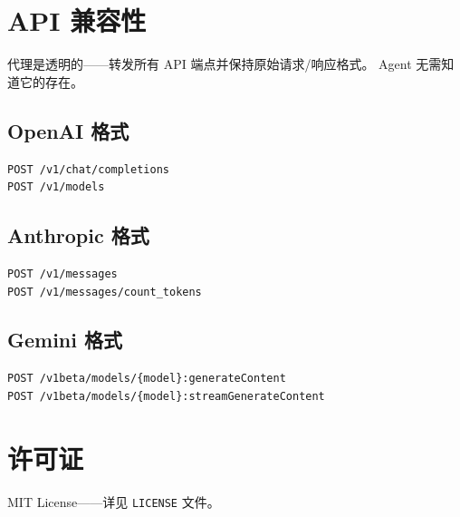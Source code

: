 \documentclass[11pt,a4paper]{article}
\begin{document}
\section{API 兼容性}

代理是透明的——转发所有 API 端点并保持原始请求/响应格式。
Agent 无需知道它的存在。

\subsection{OpenAI 格式}

\begin{verbatim}
POST /v1/chat/completions
POST /v1/models
\end{verbatim}

\subsection{Anthropic 格式}

\begin{verbatim}
POST /v1/messages
POST /v1/messages/count_tokens
\end{verbatim}

\subsection{Gemini 格式}

\begin{verbatim}
POST /v1beta/models/{model}:generateContent
POST /v1beta/models/{model}:streamGenerateContent
\end{verbatim}

\section{许可证}

MIT License——详见 \texttt{LICENSE} 文件。
\end{document}
